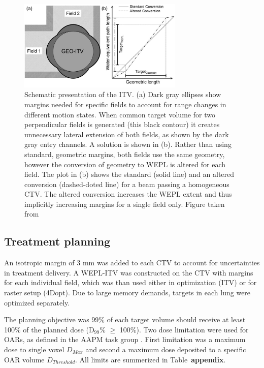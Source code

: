 \documentclass[type=dr, dr=rernat, accentcolor=tud7b,colorbacktitle, bigchapter, openright, twoside, 12pt ]{tudthesis}
\begin{document}
\begin{figure}[H]
	\begin{center}
		\includegraphics[width=0.7\textwidth]{./Images/weplITV.png}
		\caption{Schematic presentation of the ITV. (a) Dark gray ellipses show margins needed for specific fields to account for range changes in different motion states.
		When common target volume for two perpendicular fields is generated (this black contour) it creates unnecessary lateral extension of both fields, as shown by the dark gray
		entry channels. A solution is shown in (b). Rather than using standard, geometric margins, both fields use the same geometry, however the conversion of geometry to WEPL
		is altered for each field. The plot in (b) shows the standard (solid line) and an altered conversion (dashed-doted line) for a beam passing a homogeneous CTV. The altered conversion
		increases the WEPL extent and thus implicitly increasing margins for a single field only. Figure taken from \cite{Graeff2012}}
		\label{Fig:weplITV}
	\end{center}
\end{figure}

\subsection{Treatment planning}

An isotropic margin of 3 mm was added to each CTV to account for uncertainties in treatment delivery. 
A WEPL-ITV was constructed on the CTV with margins for each individual field, which was than used either in optimization (ITV)
or for raster setup (4Dopt). Due to large memory demands, targets in each lung were optimized separately. 
  
The planning objective was 99\% of each target volume should receive at least 100\% of the planned dose (D$_{99}$\% $\geq$ 100\%). Two dose limitation were used for OARs, as defined in 
the AAPM task group \cite{Benedict2010}. First limitation was a maximum dose to single voxel $D_{Max}$ and second a maximum dose deposited to a 
specific OAR volume $D_{Threshold}$. All limits are summerized in Table~\textbf{appendix}.
 
\end{document}
